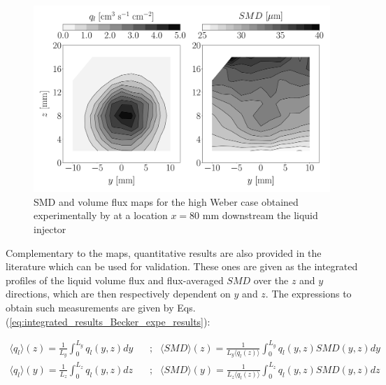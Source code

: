 \begin{figure}[h!]
\centering
   \includegraphics[scale=0.19]{./part2_developments/figures_ch6_lagrangian_JICF/expe_results/maps_UG100}
\caption{SMD and volume flux maps for the high Weber case obtained experimentally by  at a location $x = 80$ mm downstream the liquid injector}
\label{fig:maps_Becker_expe_results}
\end{figure}

Complementary to the maps, quantitative results are also provided in the literature which can be used for validation. These ones are given as the integrated profiles of the liquid volume flux and flux-averaged $SMD$ over the $z$ and $y$ directions, which are then respectively dependent on $y$ and $z$. The expressions to obtain such measurements are given by Eqs. (\ref{eq:integrated_results_Becker_expe_results}):


\begin{subequations}
\label{eq:integrated_results_Becker_expe_results}
\begin{align}
\langle q_l \rangle \left( z \right)  = \frac{1}{L_y} \int_0^{L_y} q_l \left( y, z \right) dy    & ~~~~  ; & \langle SMD \rangle \left( z \right) = \frac{1}{L_y \langle q_l \left( z \right) \rangle} \int_0^{L_y} q_l \left( y, z \right) SMD \left( y, z \right) dy \\
\langle q_l  \rangle \left( y \right) = \frac{1}{L_z} \int_0^{L_z} q_l \left( y, z \right) dz    & ~~~~  ; & \langle SMD \rangle  \left( y \right)  =  \frac{1}{L_z \langle q_l \left( z \right) \rangle} \int_0^{L_z} q_l \left( y, z \right) SMD \left( y, z \right) dz
\end{align}
\end{subequations}


